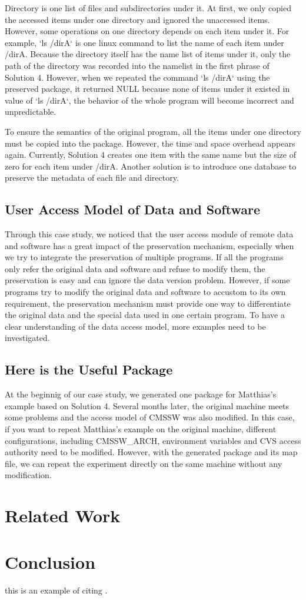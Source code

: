 \documentclass{acm_proc_article-sp}
\begin{document}
Directory is one list of files and subdirectories under it. At first, we only
copied the accessed items under one directory and ignored the unaccessed items.
However, some operations on one directory depends on each item under it. For
example, `ls /dirA` is one linux command to list the name of each item under
/dirA. Because the directory itself has the name list of items under it, only
the path of the directory was recorded into the namelist in the first phrase of
Solution 4. However, when we repeated the command `ls /dirA` using the preserved package, it returned NULL because none of items under it existed in
value of `ls /dirA`, the behavior of the whole program will become incorrect
and unpredictable. 

To ensure the semantics of the original program, all the items under one directory must be copied
into the package. However, the
time and space overhead appears again. Currently, Solution 4 creates one item
with the same name but the size of zero for each item under /dirA. Another
solution is to introduce one database to preserve the metadata of each file and
directory. 

\subsection{User Access Model of Data and Software}

Through this case study, we noticed that the user access module of remote data
and software has a great impact of the preservation mechanism, especially when
we try to integrate the preservation of multiple programs. If all the programs
only refer the original data and software and refuse to modify them, the
preservation is easy and can ignore the data version problem. However, if some
programs try to modify the original data and software to accustom to its own
requirement, the preservation mechanism must provide one way to differentiate
the original data and the special data used in one certain
program. To have a clear understanding of the data access model, more examples
need to be investigated.

\subsection{Here is the Useful Package}

At the beginnig of our case study, we generated one package for Matthias's
example based on Solution 4. Several months later, the original machine meets
some problems and the access model of CMSSW was also modified. In this case, if
you want to repeat Matthias's example on the original machine, different 
configurations, including CMSSW\_ARCH, environment variables and CVS access
authority need to be modified. However, with the generated package and its map file, we can repeat the experiment directly on the same machine without any modification.

\section{Related Work }

\section{Conclusion}

this is an example of citing \cite{Laboratories79make}. 



\end{document}
